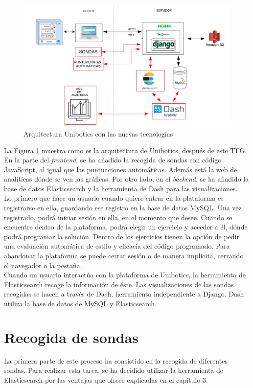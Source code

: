 \begin{figure}[H]
    \centering
    \includegraphics[width=15cm, keepaspectratio]{img/grafico2.png}
    \caption{Arquitectura Unibotics con las nuevas tecnologías}
    \label{fig:grafico2}
\end{figure}
La Figura \ref{fig:grafico2}  muestra como es la arquitectura de Unibotics, después de este TFG. En la parte del \textit{frontend}, se ha añadido la recogida de sondas con código JavaScript, al igual que las puntuaciones automáticas. Además está la web de analíticas dónde se ven las gráficas. Por otro lado, en el \textit{backend}, se ha añadido la base de datos Elasticsearch y la herramienta de Dash para las visualizaciones.\\

Lo primero que hace un usuario cuando quiere entrar en la plataforma es registrarse en ella, guardando ese registro en la base de datos MySQL. Una vez registrado, podrá iniciar sesión en ella, en el momento que desee. Cuando se encuentre dentro de la plataforma, podrá elegir un ejercicio y acceder a él, dónde podrá programar la solución. Dentro de los ejercicios tienen la opción de pedir una evaluación automática de estilo y eficacia del código programado. Para abandonar la plataforma se puede cerrar sesión o de manera implícita, cerrando el navegador o la pestaña.\\

Cuando un usuario interactúa con la plataforma de Unibotics, la herramienta de Elasticsearch recoge la información de éste. Las visualizaciones de las sondas recogidas se hacen a través de Dash, herramienta independiente a Django. Dash utiliza la base de datos de MySQL y Elasticsearch.\\
\section{Recogida de sondas}
La primera parte de este proceso ha consistido en la recogida de diferentes sondas. Para realizar esta tarea, se ha decidido utilizar la herramienta de Elasticsearch por las ventajas que ofrece explicadas en el capítulo 3.\\

